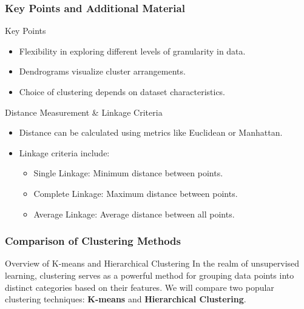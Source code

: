 \documentclass[aspectratio=169]{beamer}
\begin{document}
\begin{frame}[fragile]
    \frametitle{Key Points and Additional Material}
    \begin{block}{Key Points}
        \begin{itemize}
            \item Flexibility in exploring different levels of granularity in data.
            \item Dendrograms visualize cluster arrangements.
            \item Choice of clustering depends on dataset characteristics.
        \end{itemize}
    \end{block}
    \begin{block}{Distance Measurement \& Linkage Criteria}
        \begin{itemize}
            \item Distance can be calculated using metrics like Euclidean or Manhattan.
            \item Linkage criteria include:
            \begin{itemize}
                \item Single Linkage: Minimum distance between points.
                \item Complete Linkage: Maximum distance between points.
                \item Average Linkage: Average distance between all points.
            \end{itemize}
        \end{itemize}
    \end{block}
\end{frame}

\begin{frame}[fragile]
    \frametitle{Comparison of Clustering Methods}
    
    \begin{block}{Overview of K-means and Hierarchical Clustering}
        In the realm of unsupervised learning, clustering serves as a powerful method for grouping data points into distinct categories based on their features. We will compare two popular clustering techniques: \textbf{K-means} and \textbf{Hierarchical Clustering}.
    \end{block}
\end{frame}
\end{document}
